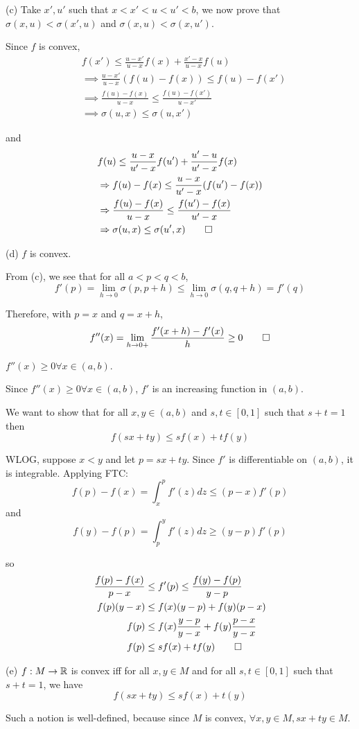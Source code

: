 \documentclass[a4paper, 11pt]{article}
\begin{document}
\begin{solution}
    (c) Take $x', u'$ such that $x < x' < u < u' < b$, we now prove that $\sigma(x, u) < \sigma(x', u)$ and $\sigma(x, u) < \sigma(x, u')$.

    Since $f$ is convex,
    \begin{align*}
        &f(x') \leq \frac{u- x'}{u-x} f(x) + \frac{x' - x}{u-x} f(u) \\
        &\implies \frac{u - x'}{u-x} (f(u) - f(x) ) \leq f(u) - f(x') \\
        &\implies \frac{f(u) - f(x)}{u-x} \leq \frac{f(u) - f(x')}{u-x'} \\
        &\implies \sigma(u, x) \leq \sigma(u, x')
    \end{align*}

    and \begin{align*}
        &f(u) \leq \frac{u-x}{u'- x}f(u') + \frac{u' - u}{u' - x}f(x) \\
        &\implies f(u) - f(x) \leq \frac{u-x}{u'-x}(f(u') - f(x)) \\
        &\implies \frac{f(u) - f(x)}{u - x} \leq \frac{f(u') - f(x)}{u' - x} \\
        &\implies \sigma(u, x) \leq \sigma(u', x) \qed
    \end{align*}

    (d) \pffwd $f$ is convex.

    From (c), we see that for all $ a < p < q < b$, \[
    f'(p) = \lim_{h\to 0} \sigma(p, p+h) \leq \lim_{h\to 0} \sigma(q, q + h) = f'(q)
    \]

    Therefore, with $p = x$ and $q = x + h$, \[
    f''(x) = \lim_{h \to 0+} \frac{f'(x+h) - f'(x)}{h} \geq 0 \qed
    \]

    \pfbwd $f''(x) \geq 0 \forall x \in (a, b)$.

    Since $f''(x) \geq 0 \forall x \in (a, b)$, $f'$ is an increasing function in $(a, b)$.

    We want to show that for all $x, y \in (a, b)$ and $s, t \in [0, 1]$ such that $s + t = 1$ then \[
    f(sx + ty) \leq sf(x) + t f(y)
    \]

    WLOG, suppose $x < y$ and let $p = sx + ty$. Since $f'$ is differentiable on $(a, b)$, it is integrable. Applying FTC: \[
    f(p) - f(x) = \int_{x}^{p} f'(z) dz \leq (p-x) f'(p)
    \]
    and \[
    f(y) - f(p) = \int_{p}^{y} f'(z) dz \geq (y - p) f'(p)
    \]

    so \begin{align*}
        \frac{f(p) - f(x) }{p-x} &\leq f'(p) \leq \frac{f(y) - f(p)}{y -p} \\
         f(p) (y-x) &\leq f(x)(y-p) + f(y) (p-x) \\
        f(p) &\leq f(x) \frac{y-p}{y-x} + f(y) \frac{p-x}{y-x} \\
        f(p) &\leq sf(x) + tf(y) \qed
    \end{align*}

    (e) $f: M \to \bbr$ is convex iff for all $x, y \in M$ and for all $s, t \in [0,1]$ such that $s + t = 1$, we have \[
    f(sx + ty) \leq sf(x) + t(y)
    \]

    Such a notion is well-defined, because since $M$ is convex, $\forall x, y \in M, sx + ty \in M$.
\end{solution}
\end{document}
